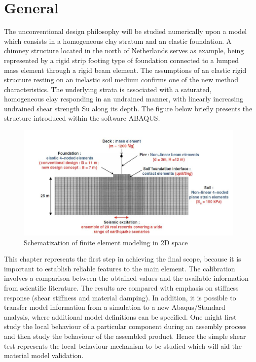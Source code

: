 \documentclass[11pt,a4paper]{report}
\begin{document}
\section{General}
The unconventional design philosophy will be studied numerically upon a model which consists in a homogeneous clay stratum and an elastic foundation.  A chimney structure located in the north of Netherlands serves as example, being represented by a rigid strip footing type of foundation connected to a lumped mass element through a rigid beam element. The assumptions of an elastic rigid structure resting on an inelastic soil medium confirms one of the new method characteristics. The underlying strata is associated with a saturated, homogeneous clay responding in an undrained manner, with linearly increasing undrained shear strength Su along its depth. The figure below briefly presents the structure introduced within the software ABAQUS.

\begin{figure}[h!]
	\centering
	\includegraphics[width=0.8\linewidth]{"scheme2D"}
	\caption{Schematization of finite element modeling in 2D space}
	\label{FEM2d}
\end{figure}

This chapter represents the first step in achieving the final scope, because it is important to establish reliable features to the main element. The calibration involves a comparison between the obtained values and the available information from scientific literature. The results are compared with emphasis on stiffness response (shear stiffness and material damping). In addition, it is possible to transfer model information from a simulation to a new Abaqus/Standard analysis, where additional model definitions can be specified. One might first study the local behaviour of a particular component during an assembly process and then study the behaviour of the assembled product. Hence the simple shear test represents the local behaviour mechanism to be studied which will aid the material model validation. 
\end{document}
